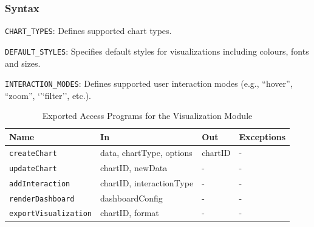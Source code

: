 \documentclass[12pt, titlepage]{article}
\begin{document}
\subsubsection{Syntax}
\begin{description}
  \item[Exported Constants and Access Programs:]
  \item \texttt{CHART\_TYPES}: Defines supported chart types.
  \item \texttt{DEFAULT\_STYLES}: Specifies default styles for visualizations including colours, 
  fonts and sizes.
  \item \texttt{INTERACTION\_MODES}: Defines supported user interaction modes
  (e.g., ``hover'', ``zoom'', `'`filter'', etc.).
  \item
  \begin{table}[H]
    \centering
    \begin{tabular}{p{} p{} p{} p{}}
    \toprule
    \textbf{Name} & \textbf{In} & \textbf{Out} & \textbf{Exceptions}\\
    \midrule
    \texttt{createChart} & data, chartType, options & chartID & - \\
    \midrule
    \texttt{updateChart} & chartID, newData & - & - \\
    \midrule
    \texttt{addInteraction} & chartID, interactionType & - & - \\
    \midrule
    \texttt{renderDashboard} & dashboardConfig & - & - \\
    \midrule
    \texttt{exportVisualization} & chartID, format & - & - \\
    \bottomrule
    \end{tabular}
    \caption{Exported Access Programs for the Visualization Module}
    \label{TblEAP_Visualization}
  \end{table}
\end{description}
\end{document}
